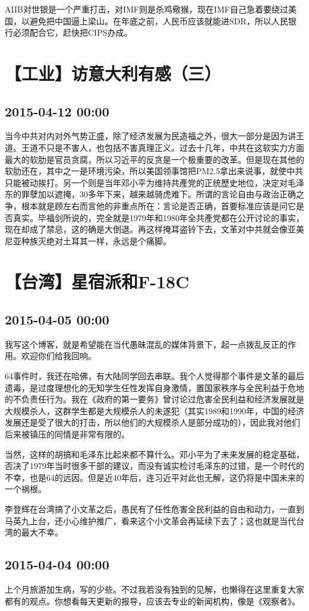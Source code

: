\documentclass[twocolumn]{ctexart}
\begin{document}
AIIB对世银是一个严重打击，对IMF则是杀鸡儆猴，现在IMF自己急着要绕过美国，以避免把中国逼上梁山。在年底之前，人民币应该就能进SDR，所以人民银行必须配合它，赶快把CIPS办成。\section*{【工业】访意大利有感（三）}
\subsection*{2015-04-12 00:00}
当今中共对内对外气势正盛，除了经济发展为民造福之外，很大一部分是因为讲王道。王道不只是不害人，也包括不害真理正义。过去十几年，中共在这软实力方面最大的软肋是官员贪腐，所以习近平的反贪是一个极重要的改革。但是现在其他的软肋还在，其中之一是环境污染，所以美国领事馆把PM2.5拿出来说事，就使中共只能被动挨打。另一个则是当年邓小平为维持共產党的正统歷史地位，决定对毛泽东的罪孽加以遮掩，30多年下来，越来越骑虎难下。所谓的言论自由与政治正确之争，根本就是顾左右而言他的非重点所在：言论是否正确，首要标准应该是问它是否真实。毕福剑所说的，完全就是1979年和1980年全共產党都在公开讨论的事实，现在却成了禁忌，这的确是大倒退。再这样掩耳盗铃下去，文革对中共就会像亚美尼亚种族灭绝对土耳其一样，永远是个痛脚。\section*{【台湾】星宿派和F-18C}
\subsection*{2015-04-05 00:00}
我写这个博客，就是希望能在当代愚昧混乱的媒体背景下，起一点拨乱反正的作用。欢迎你们给我回响。

64事件时，我还在哈佛，有大陆同学回去串联。我个人觉得那个事件是文革的最后遗毒，是过度理想化的无知学生任性发挥自身激情，置国家秩序与全民利益于危地的不负责任行为。我在《政府的第一要务》曾讨论过危害全民利益和经济发展就是大规模杀人，这群学生都是大规模杀人的未遂犯（其实1989和1990年，中国的经济发展还是受了很大的打击，所以他们的大规模杀人是部分成功的），因此我对他们后来被镇压的同情是非常有限的。

当然，这样的胡搞和毛泽东比起来都不算什么。邓小平为了未来发展的稳定基础，否决了1979年当时很多干部的建议，而没有诚实检讨毛泽东的过错，是一个时代的不幸，也是64的远因。但是近40年后，连习近平对此也无解，这仍将是中国未来的一个祸根。

李登辉在台湾搞了小文革之后，愚民有了任性危害全民利益的自由和动力，一直到马英九上台，还小心维护推广，看来这个小文革会再延续下去了；这也就是当代台湾的最大不幸。\subsection*{2015-04-04 00:00}
上个月旅游加生病，写的少些。不过我若没有独到的见解，也懒得在这里重复大家都有的观点。你想看每天更新的报导，应该去专业的新闻机构，像是《观察者》。
\end{document}
